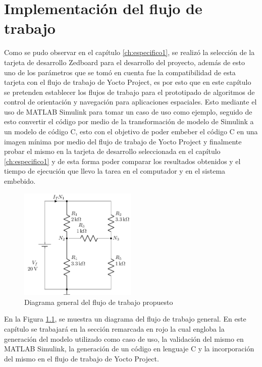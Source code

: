 \chapter{Implementación del flujo de trabajo}
\label{ch:especifico2}

Como se pudo observar en el capítulo \ref{ch:especifico1}, se realizó la selección de la tarjeta de desarrollo Zedboard para el desarrollo del proyecto, además de esto uno de los parámetros que se tomó en cuenta fue la compatibilidad de esta tarjeta con el flujo de trabajo de Yocto Project, es por esto que en este capítulo se pretenden establecer los flujos de trabajo para el prototipado de algoritmos de control de orientación y navegación para aplicaciones espaciales. Esto mediante el uso de MATLAB Simulink para tomar un caso de uso como ejemplo, seguido de esto convertir el código por medio de la transformación de modelo de Simulink a un modelo de código C, esto con el objetivo de poder embeber el código C en una imagen mínima por medio del flujo de trabajo de Yocto Project y finalmente probar el mismo en la tarjeta de desarrollo seleccionada en el capítulo \ref{ch:especifico1} y de esta forma poder comparar los resultados obtenidos y el tiempo de ejecución que llevo la tarea en el computador y en el sistema embebido.


\begin{figure}[h!]
    \centering
    \includegraphics[width=0.5\textwidth]{fig/figtemplate.pdf}
    \caption{Diagrama general del flujo de trabajo propuesto}
    \label{fig:diagrama_flujo_trabajo}
\end{figure}


En la Figura \ref{fig:diagrama_flujo_trabajo}, se muestra un diagrama del flujo de trabajo general. En este capítulo se trabajará en la sección remarcada en rojo la cual engloba la generación del modelo utilizado como caso de uso, la validación del mismo en MATLAB Simulink, la generación de un código en lenguaje C y la incorporación del mismo en el flujo de trabajo de Yocto Project.


